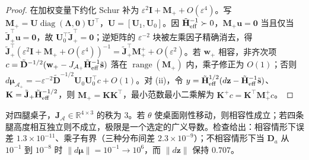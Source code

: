 \begin{proof}
在加权变量下约化 Schur 补为 $\varepsilon^2\mathbf I+\mathbf M_++O(\varepsilon^4)$。写 $\mathbf M_+=\mathbf U\operatorname{diag}(\boldsymbol\Lambda,\mathbf 0)\mathbf U^\top$，$\mathbf U=[\mathbf U_1,\mathbf U_0]$。因 $\tilde{\mathbf H}_{\rm eff}^{-1}\succ0$，$\mathbf M_+\mathbf u=\mathbf 0$ 当且仅当 $\tilde{\mathbf J}_+^\top\mathbf u=\mathbf 0$，故 $\mathbf U_0^\top\tilde{\mathbf J}_+^\top=\mathbf 0$；逆矩阵的 $\varepsilon^{-2}$ 块被左乘因子精确消去，得 $\tilde{\mathbf J}_+^\top(\varepsilon^2\mathbf I+\mathbf M_++O(\varepsilon^4))^{-1}=\tilde{\mathbf J}_+^\top\mathbf M_+^++O(\varepsilon^2)$。若 $\mathbf w_+$ 相容，非齐次项 $c=\tilde{\mathbf D}^{-1/2}(\mathbf w_+-J_{\mathcal A_+}\tilde{\mathbf H}_{\rm eff}^{-1}\tilde{\mathbf s})$ 落在 $\operatorname{range}(\mathbf M_+)$ 内，乘子修正为 $O(1)$；否则 $d\boldsymbol\mu_{\mathcal A_+}=-\varepsilon^{-2}\tilde{\mathbf D}^{-1/2}\mathbf U_0\mathbf U_0^\top c+O(1)$。对 (ii)，令 $y=\tilde{\mathbf H}_{\rm eff}^{1/2}(d\mathbf z-\tilde{\mathbf H}_{\rm eff}^{-1}\tilde{\mathbf s})$、$\mathbf K=\tilde{\mathbf J}_+\tilde{\mathbf H}_{\rm eff}^{-1/2}$，则 $\mathbf M_+=\mathbf K\mathbf K^\top$，最小范数最小二乘解为 $\mathbf K^+c=\mathbf K^\top\mathbf M_+^+c$。
\end{proof}
对四腿桌子，$\mathbf J_{\mathcal A}\in\mathbb{R}^{4\times3}$ 的秩为 3。若 $\theta$ 使桌面刚性移动，则相容性成立；若四条腿高度相互独立则不成立，极限是一个选定的广义导数。检查给出：相容情形下误差 $1.3\times10^{-11}$、乘子有界（三种分布间差 $2.3\times10^{-9}$）；不相容情形下当 $\mathbf D_a$ 从 $10^{-1}$ 到 $10^{-8}$ 时 $\|d\boldsymbol\mu\|=10^{-1}\to10^{6}$，而 $\|d\mathbf z\|$ 保持 $0.707$。

